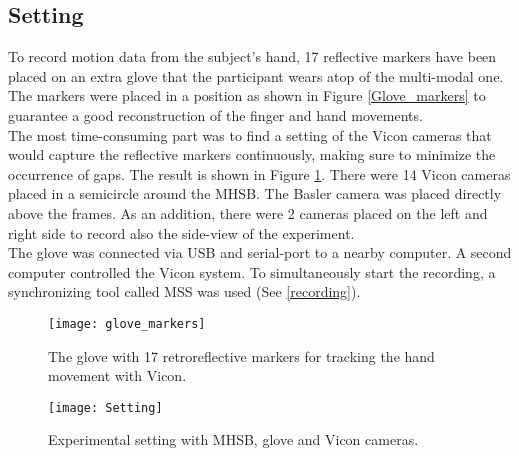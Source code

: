 \subsection{Setting}
To record motion data from the subject's hand, 17 reflective markers have been placed on an extra glove that the participant wears atop of the multi-modal one. The markers were placed in a position as shown in Figure \ref{Glove_markers} to guarantee a good reconstruction of the finger and hand movements.\\
The most time-consuming part was to find a setting of the Vicon cameras that would capture the reflective markers continuously, making sure to minimize the occurrence of gaps. The result is shown in Figure \ref{Setting}. There were 14 Vicon cameras placed in a semicircle around the MHSB. The Basler camera was placed directly above the frames. As an addition, there were 2 cameras placed on the left and right side to record also the side-view of the experiment.\\
The glove was connected via USB and serial-port to a nearby computer. A second computer controlled the Vicon system. To simultaneously start the recording, a synchronizing tool called MSS was used (See \ref{recording}).

\begin{figure}[H]
	\begin{minipage}[t]{0.49\textwidth}
		\centering
		\texttt{[image: glove\_markers]}
		\captionsetup{width=0.9\linewidth}
		\caption{The glove with 17 retroreflective markers for tracking the hand movement with Vicon.}
		\label{Glove_markers}
	\end{minipage}
	\hspace{\fill}
	\begin{minipage}[t]{0.49\textwidth}
		\texttt{[image: Setting]}
		\captionsetup{width=0.9\linewidth}
		\caption{Experimental setting with MHSB, glove and Vicon cameras.}
		\label{Setting}
	\end{minipage}
\end{figure}
 